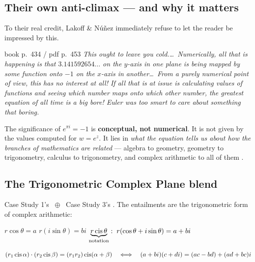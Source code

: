\subsection{Their own anti-climax --- and why it matters}

To their real credit, Lakoff \& Núñez immediately refuse to let the reader be impressed by this.

\begin{bookquote}{book p.~434 / pdf p.~453}
\textit{This ought to leave you cold.\ldots\ Numerically, all that is happening is that
$3.141592654\ldots$ on the $y$-axis in one plane is being mapped by some function onto $-1$ on the
$x$-axis in another\ldots\ From a purely numerical point of view, this has no interest at all!
If all that is at issue is calculating values of functions and seeing which number maps onto which
other number, the greatest equation of all time is a big bore! Euler was too smart to care about
something that boring.}
\end{bookquote}

\begin{keybox}[title={The move that organises the rest of the case study}]
The significance of $e^{\pi i}=-1$ is \textbf{conceptual, not numerical}. It is not given by the
values computed for $w=e^{z}$. It lies in \emph{what the equation tells us about how the branches of
mathematics are related} --- algebra to geometry, geometry to trigonometry, calculus to trigonometry,
and complex arithmetic to all of them .
\end{keybox}

\subsection{The Trigonometric Complex Plane blend}

Case Study 1's  $\;\oplus\;$ Case Study 3's . The entailments are the trigonometric form of complex arithmetic:

\begin{center}
\begin{tcolorbox}[enhanced,width=0.95\textwidth,colback=csD!4,colframe=csD,boxrule=1pt,arc=3pt,
  title={\bfseries Entailments in the blend \normalfont\itshape(book p.~437 / pdf p.~456)},
  fonttitle=\bfseries,coltitle=white,colbacktitle=csD]
\begin{center}
$r\cos\theta=a$ \qquad $r(i\sin\theta)=bi$ \qquad
$\underbrace{r\operatorname{cis}\theta}_{\text{\scriptsize notation}}:\;r(\cos\theta+i\sin\theta)=a+bi$
\end{center}
\vspace{2pt}
\[
(r_1\operatorname{cis}\alpha)\cdot(r_2\operatorname{cis}\beta)=(r_1r_2)\operatorname{cis}(\alpha+\beta)
\quad\Longleftrightarrow\quad
(a+bi)(c+di)=(ac-bd)+(ad+bc)i
\]
\end{tcolorbox}
\end{center}

